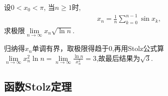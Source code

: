 \documentclass[../../main.tex]{subfiles}%
\begin{document}
\begin{example}
设$0<x_0<\pi$, 当$n\geqslant 1$时,
\begin{align*}
x_n = \frac{1}{n}\sum_{k=0}^{n-1} \sin x_k,
\end{align*}
求极限$\lim\limits_{n\to\infty} x_n\sqrt{\ln n}$.
\end{example}
\begin{solution}

归纳得$x_n$单调有界，取极限得趋于0,再用Stolz公式算$\underset{n\rightarrow \infty}{\lim}x_{n}^{2}\ln n=\underset{n\rightarrow \infty}{\lim}\frac{\ln n}{x_{n}^{2}}=3$,故最后结果为$\sqrt{3}$.

\end{solution}


\subsection{函数Stolz定理}
\end{document}
